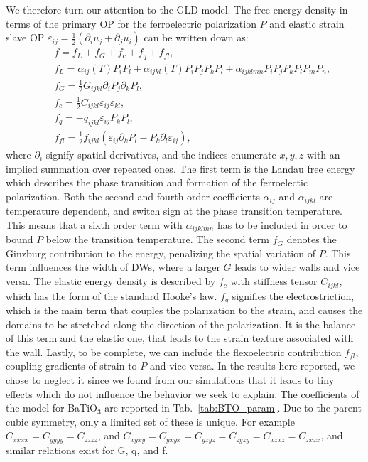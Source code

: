 We therefore turn our attention to the GLD model.
The free energy density in terms of the primary OP for the ferroelectric polarization $P$ and elastic strain slave OP $\varepsilon_{ij} = \frac{1}{2}(\partial_i u_j + \partial_j u_i)$ can be written down as:
\begin{eqnarray}\label{eq:BTO_energy}
&&f = f_{L}+f_{G}+f_{c}+f_{q}+f_{fl},\\
&&f_{L} = \alpha_{ij}(T)P_iP_l + \alpha_{ijkl}(T)P_{i}P_{j}P_{k}P_{l} + \alpha_{ijklmn} P_i P_j P_k P_l P_m P_n,\\
&&f_{G} = \frac{1}{2}G_{ijkl}\partial_i P_j\partial_k P_l,\\
&&f_{c} = \frac{1}{2}C_{ijkl}\varepsilon_{ij}\varepsilon_{kl},\\
&&f_{q}= - q_{ijkl}\varepsilon_{ij}P_{k}P_{l},\label{eq:qpp}\\
&&f_{fl}=\frac{1}{2}f_{ijkl}(\varepsilon_{ij}\partial_k P_l - P_k\partial_l\varepsilon_{ij}),
\end{eqnarray}
where $\partial_i$ signify spatial derivatives, and the indices enumerate ${x,y,z}$ with an implied summation over repeated ones.
The first term is the Landau free energy which describes the phase transition and formation of the ferroelectic polarization.
Both the second and fourth order coefficients $\alpha_{ij}$ and $\alpha_{ijkl}$ are temperature dependent, and switch sign at the phase transition temperature.
This means that a sixth order term with $\alpha_{ijklmn}$ has to be included in order to bound $P$ below the transition temperature.
The second term $f_G$ denotes the Ginzburg contribution to the energy, penalizing the spatial variation of $P$.  
This term influences the width of DWs, where a larger $G$ leads to wider walls and vice versa.
The elastic energy density is described by $f_c$ with stiffness tensor $C_{ijkl}$, which has the form of the standard Hooke's law.
$f_q$ signifies the electrostriction, which is the main term that couples the polarization to the strain, and causes the domains to be stretched along the direction of the polarization.
It is the balance of this term and the elastic one, that leads to the strain texture associated with the wall.
Lastly, to be complete, we can include the flexoelectric contribution $f_{fl}$, coupling gradients of strain to $P$ and vice versa.
In the results here reported, we chose to neglect it since we found from our simulations that it leads to tiny effects which do not influence the behavior we seek to explain.
The coefficients of the model for BaTiO$_3$ are reported in Tab.~\ref{tab:BTO_param}.
Due to the parent cubic symmetry, only a limited set of these is unique.
For example $C_{xxxx} = C_{yyyy} = C_{zzzz}$, and $C_{xyxy} = C_{yxyx} = C_{yzyz} = C_{zyzy} = C_{xzxz} = C_{zxzx}$, and similar relations exist for G, q, and f. 

